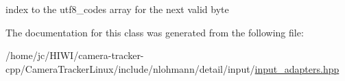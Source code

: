 index to the utf8\+\_\+codes array for the next valid byte 



The documentation for this class was generated from the following file\+:\begin{DoxyCompactItemize}
\item 
/home/jc/\+H\+I\+W\+I/camera-\/tracker-\/cpp/\+Camera\+Tracker\+Linux/include/nlohmann/detail/input/\hyperlink{input__adapters_8hpp}{input\+\_\+adapters.\+hpp}\end{DoxyCompactItemize}
